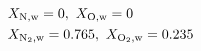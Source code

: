 \documentclass[10pt]{article}
\begin{document}
\begin{align*}& X_{\rm N, w}=0, \ X_{\rm O, w}=0
\\
& X_{\rm N_{2}, w}=0.765, \ X_{\rm O_{2}, w}=0.235\end{align*}
\end{document}
